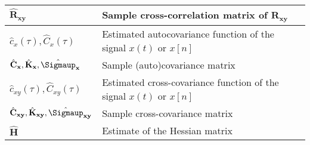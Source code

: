 \begin{xltabular}{\textwidth}{XX}
	\(\hat{\mathbf{R}}_\mathbf{xy}\)                                                                              & Sample cross-correlation matrix of \(\mathbf{R}_\mathbf{xy}\)                                              \\ \hline
	\(\hat{c}_x(\tau), \hat{C}_x(\tau)\)                                                                          & Estimated autocovariance function of the signal \(x(t)\) or \(x[n]\)                                       \\ \hline
	\(\hat{\mathbf{C}}_\mathbf{x}, \hat{\mathbf{K}}_\mathbf{x}, \hat{\boldsymbol{\Sigmaup}}_\mathbf{x}\)          & Sample (auto)covariance matrix                                                                             \\ \hline
	\(\hat{c}_{xy}(\tau), \hat{C}_{xy}(\tau)\)                                                                    & Estimated cross-covariance function of the signal \(x(t)\) or \(x[n]\)                                     \\ \hline
	\(\hat{\mathbf{C}}_{\mathbf{xy}}, \hat{\mathbf{K}}_{\mathbf{xy}}, \hat{\boldsymbol{\Sigmaup}}_{\mathbf{xy}}\) & Sample cross-covariance matrix                                                                             \\ \hline
	\(\hat{\mathbf{H}}\)                                                                                          & Estimate of the Hessian matrix
\end{xltabular}

